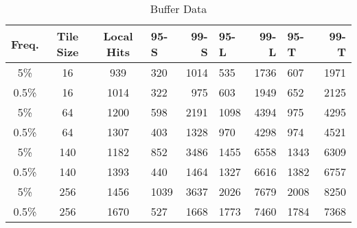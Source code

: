 \begin{table}
	\begin{center}
		\begin{tabular}{|c|c|c|l|r|l|r|l|r|}
			\hline
			Freq. & Tile Size & Local Hits & 95-S & 99-S & 95-L & 99-L & 95-T & 99-T \\
			\hline
			5\% & 16 & 939 & 320 & 1014 & 535 & 1736 & 607 & 1971 \\
			\hline
			0.5\% & 16 & 1014 & 322 & 975 & 603 & 1949 & 652 & 2125 \\
			\hline
			5\% & 64 & 1200 & 598 & 2191 & 1098 & 4394 & 975 & 4295 \\
			\hline
			0.5\% & 64 & 1307 & 403 & 1328 & 970 & 4298 & 974 & 4521 \\
			\hline
			5\% & 140 & 1182 & 852 & 3486 & 1455 & 6558 & 1343 & 6309 \\
			\hline
			0.5\% & 140 & 1393 & 440 & 1464 & 1327 & 6616 & 1382 & 6757 \\
			\hline
			5\% & 256 & 1456 & 1039 & 3637 & 2026 & 7679 & 2008 & 8250 \\
			\hline
			0.5\% & 256 & 1670 & 527 & 1668 & 1773 & 7460 & 1784 & 7368 \\
			\hline
		\end{tabular}
	\end{center}
	\caption{Buffer Data}
	\label{tab:buffers}
\end{table}
